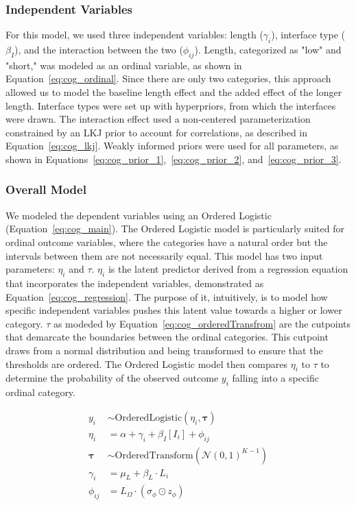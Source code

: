 \subsubsection{Independent Variables}
For this model, we used three independent variables: length ($\gamma_i$), interface type ($\beta_I$), and the interaction between the two ($\phi_{ij}$). Length, categorized as "low" and "short," was modeled as an ordinal variable, as shown in Equation~\ref{eq:cog_ordinal}. Since there are only two categories, this approach allowed us to model the baseline length effect and the added effect of the longer length. Interface types were set up with hyperpriors, from which the interfaces were drawn. The interaction effect used a non-centered parameterization constrained by an LKJ prior to account for correlations, as described in Equation~\ref{eq:cog_lkj}. Weakly informed priors were used for all parameters, as shown in Equations~\ref{eq:cog_prior_1},~\ref{eq:cog_prior_2}, and~\ref{eq:cog_prior_3}.

\subsubsection{Overall Model}
We modeled the dependent variables using an Ordered Logistic (Equation~\ref{eq:cog_main}). The Ordered Logistic model is particularly suited for ordinal outcome variables, where the categories have a natural order but the intervals between them are not necessarily equal. This model has two input parameters: $\eta_i$ and $\tau$. $\eta_i$ is the latent predictor derived from a regression equation that incorporates the independent variables, demonstrated as Equation~\ref{eq:cog_regression}. The purpose of it, intuitively, is to model how specific independent variables pushes this latent value towards a higher or lower category. $\tau$ as modeded by Equation~\ref{eq:cog_orderedTransfrom} are the cutpoints that demarcate the boundaries between the ordinal categories. This cutpoint draws from a normal distribution and being transformed to ensure that the thresholds are ordered. The Ordered Logistic model then compares $\eta_i$ to $\tau$ to determine the probability of the observed outcome $y_i$ falling into a specific ordinal category.


\begin{align}
    y_i &\sim \text{OrderedLogistic}(\eta_i, \boldsymbol{\tau}) \label{eq:cog_main}\\
    \eta_i &= \alpha + \gamma_i + \beta_I[I_i] + \phi_{ij} \label{eq:cog_regression}\\
    \boldsymbol{\tau} &\sim \text{OrderedTransform}(\mathcal{N}(0, 1)^{K-1}) \label{eq:cog_orderedTransfrom} \\
    \gamma_i &= \mu_L + \beta_L \cdot L_i \label{eq:cog_ordinal} \\
    \phi_{ij} &= L_{\Omega} \cdot (\sigma_{\phi} \odot z_{\phi}) \label{eq:cog_lkj}
\end{align}


